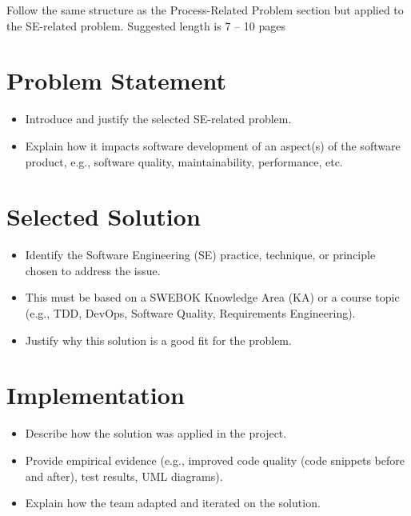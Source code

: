\noindent Follow the same structure as the Process-Related Problem section but applied to the SE-related problem. Suggested length is 7 – 10 pages

\section{Problem Statement}

\begin{itemize}

    \item [-] Introduce and justify the selected SE-related problem.
    \item [-] Explain how it impacts software development of an aspect(s) of the software product, e.g., software quality, maintainability, performance, etc.
  
\end{itemize}

\section{Selected Solution}

\begin{itemize}

    \item [-] Identify the Software Engineering (SE) practice, technique, or principle chosen to address the issue.
    \item [-] This must be based on a SWEBOK Knowledge Area (KA) or a course topic (e.g., TDD, DevOps, Software Quality, Requirements Engineering).
    \item [-] Justify why this solution is a good fit for the problem.

\end{itemize}


\section{Implementation}

\begin{itemize}

    \item [-] Describe how the solution was applied in the project.
    \item [-] Provide empirical evidence (e.g., improved code quality (code snippets before and after), test results, UML diagrams).
    \item [-] Explain how the team adapted and iterated on the solution.
    
\end{itemize}

